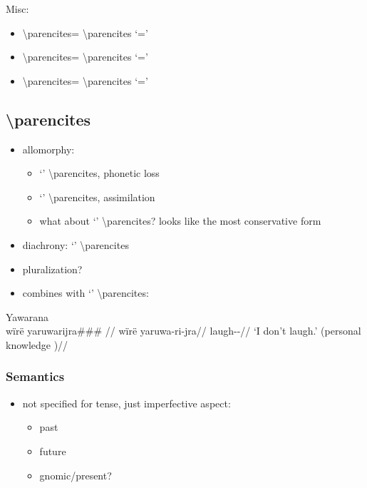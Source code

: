 \documentclass{memoir}
\begin{document}
Misc:

\begin{itemize}
\tightlist
\item
   \textbackslash parencites=
  \textbackslash parencites `='
\item
   \textbackslash parencites=
  \textbackslash parencites `='
\item
   \textbackslash parencites=
  \textbackslash parencites `='
\end{itemize}

\subsection{\texorpdfstring{ \textbackslash parencites
\label{sec:riipfv}}{ \textbackslash parencites }}

\begin{itemize}
\tightlist
\item
  allomorphy:

  \begin{itemize}
  \tightlist
  \item
     `' \textbackslash parencites, phonetic loss
  \item
     `' \textbackslash parencites, assimilation
  \item
    what about  `' \textbackslash parencites? looks
    like the most conservative form
  \end{itemize}
\item
  diachrony:  `' \textbackslash parencites
\item
  pluralization?
\item
  combines with  `' \textbackslash parencites:
\end{itemize}

\ex  Yawarana  \\\label{convrisamaj-4}
\begingl \glpreamble wïrë yaruwarijra### //
\gla wïrë yaruwa-ri-jra//
\glb {} laugh--//
\glft ‘I don’t laugh.’ (personal knowledge
)//
\endgl
\xe

\subsubsection{Semantics}

\begin{itemize}
\tightlist
\item
  not specified for tense, just imperfective aspect:

  \begin{itemize}
  \tightlist
  \item
    past 
  \item
    future 
  \item
    gnomic/present? 
  \end{itemize}
\end{itemize}
\end{document}
